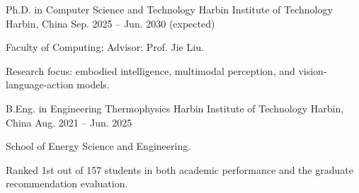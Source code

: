 
\begin{cventries}
  \cventry
    {Ph.D. in Computer Science and Technology}
    {Harbin Institute of Technology}
    {Harbin, China}
    {Sep. 2025 -- Jun. 2030 (expected)}
    {
      \begin{cvitems}
        \item {Faculty of Computing; Advisor: Prof. Jie Liu.}
        \item {Research focus: embodied intelligence, multimodal perception, and vision-language-action models.}
      \end{cvitems}
    }

  \cventry
    {B.Eng. in Engineering Thermophysics}
    {Harbin Institute of Technology}
    {Harbin, China}
    {Aug. 2021 -- Jun. 2025}
    {
      \begin{cvitems}
        \item {School of Energy Science and Engineering.}
        \item {Ranked 1st out of 157 students in both academic performance and the graduate recommendation evaluation.}
      \end{cvitems}
    }
\end{cventries}
